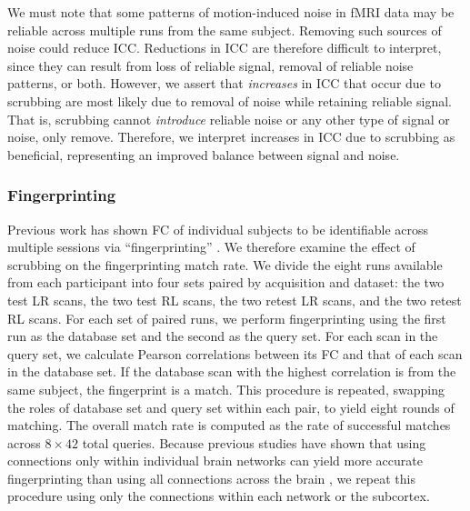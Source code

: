\documentclass{article}
\begin{document}
We must note that some patterns of motion-induced noise in fMRI data may be reliable across multiple runs from the same subject. Removing such sources of noise could reduce ICC. Reductions in ICC are therefore difficult to interpret, since they can result from loss of reliable signal, removal of reliable noise patterns, or both.  However, we assert that \textit{increases} in ICC that occur due to scrubbing are most likely due to removal of noise while retaining reliable signal. That is, scrubbing cannot \textit{introduce} reliable noise or any other type of signal or noise, only remove.  Therefore, we interpret increases in ICC due to scrubbing as beneficial, representing an improved balance between signal and noise. 



\subsubsection{Fingerprinting}\label{sec:fingerprinting_methods}
Previous work has shown FC of individual subjects to be identifiable across multiple sessions via ``fingerprinting'' \citep{finnFunctionalConnectomeFingerprinting2015}. We therefore examine the effect of scrubbing on the fingerprinting match rate. We divide the eight runs available from each participant into four sets paired by acquisition and dataset: the two test LR scans, the two test RL scans, the two retest LR scans, and the two retest RL scans. For each set of paired runs, we perform fingerprinting using the first run as the database set and the second as the query set. For each scan in the query set, we calculate Pearson correlations between its FC and that of each scan in the database set. If the database scan with the highest correlation is from the same subject, the fingerprint is a match. This procedure is repeated, swapping the roles of database set and query set within each pair, to yield eight rounds of matching. The overall match rate is computed as the rate of successful matches across $8 \times 42$ total queries.
Because previous studies have shown that using connections only within individual brain networks can yield more accurate fingerprinting than using all connections across the brain \citep{finnFunctionalConnectomeFingerprinting2015}, we repeat this procedure using only the connections within each network or the subcortex. 
\end{document}
